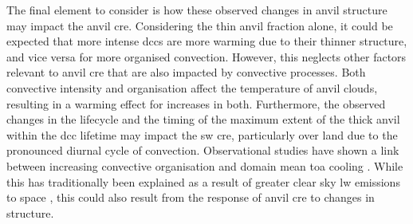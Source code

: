 The final element to consider is how these observed changes in anvil structure may impact the anvil \acrshort{cre}.
Considering the thin anvil fraction alone, it could be expected that more intense \acrshort{dcc}s are more warming due to their thinner structure, and vice versa for more organised convection.
However, this neglects other factors relevant to anvil \acrshort{cre} that are also impacted by convective processes.
Both convective intensity and organisation affect the temperature of anvil clouds, resulting in a warming effect for increases in both.
Furthermore, the observed changes in the lifecycle and the timing of the maximum extent of the thick anvil within the \acrshort{dcc} lifetime may impact the \acrshort{sw} \acrshort{cre}, particularly over land due to the pronounced diurnal cycle of convection.
Observational studies have shown a link between increasing convective organisation and domain mean \acrshort{toa} cooling \citep{bony_observed_2020}.
While this has traditionally been explained as a result of greater clear sky \acrshort{lw} emissions to space \citep{bony_thermodynamic_2016}, this could also result from the response of anvil \acrshort{cre} to changes in structure.

